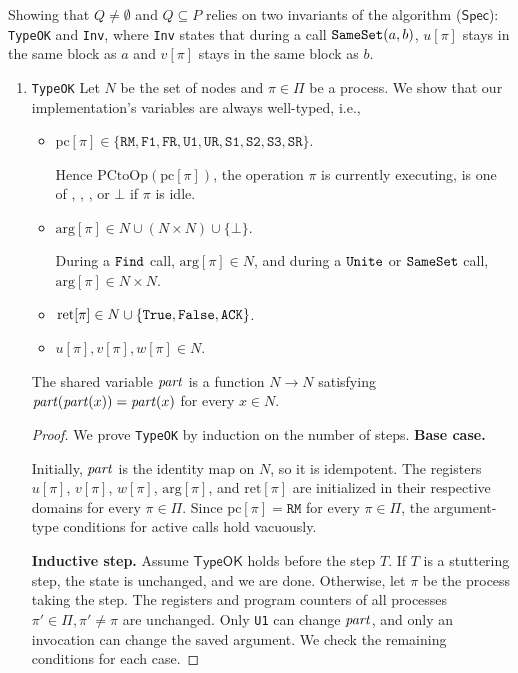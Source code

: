 \documentclass[12pt]{amsproc}
\begin{document}
Showing that $Q \neq \emptyset$ and $Q \subseteq P$ relies on two invariants of the algorithm ($\mathsf{Spec}$): \texttt{TypeOK} and \texttt{Inv}, where \texttt{Inv} states that during a call $\texttt{SameSet}{}(a,b)$, $u[\pi]$ stays in the same block as $a$ and $v[\pi]$ stays in the same block as $b$.
\begin{enumerate}
    \item \texttt{TypeOK}
    \bbni
    Let $N$ be the set of nodes and $\pi \in \Pi$ be a process. We show that our implementation's variables are always well-typed, i.e.,
    \begin{itemize}
        \item $\mathrm{pc}[\pi]\in \{\texttt{RM}, \texttt{F1}, \texttt{FR}, \texttt{U1}, \texttt{UR}, \texttt{S1}, \texttt{S2}, \texttt{S3}, \texttt{SR}\}$.

        Hence $\mathrm{PCtoOp}(\mathrm{pc}[\pi])$, the operation $\pi$ is currently executing, is one of \Find{}, \Unite{}, \SameSet{}, or $\bot$ if $\pi$ is idle.

        \item $\mathrm{arg}[\pi]\in N\cup(N\times N)\cup\{\bot\}$.
        
        During a $\texttt{Find}{}$ call, $\mathrm{arg}[\pi]\in N$, and during a $\texttt{Unite}{}$ or $\texttt{SameSet}{}$ call, $\mathrm{arg}[\pi]\in N\times N$.

        \item $\mathrm{ret}[\pi]\in N\cup\{\texttt{True{}}{},\texttt{False{}}{},\texttt{ACK}\}$.

        \item $u[\pi],v[\pi],w[\pi]\in N$.
    \end{itemize}
    The shared variable $\mathit{part}$ is a function $N\to N$ satisfying $\mathit{part}(\mathit{part}(x))=\mathit{part}(x)$ for every $x\in N$.

    \begin{proof}

    \bbni 
    
    We prove \texttt{TypeOK} by induction on the number of steps.
    \bbni
    \textbf{Base case.}

    Initially, $\mathit{part}$ is the identity map on $N$, so it is idempotent. The registers $u[\pi]$, $v[\pi]$, $w[\pi]$, $\mathrm{arg}[\pi]$, and $\mathrm{ret}[\pi]$ are initialized in their respective domains for every $\pi\in\Pi$. Since $\mathrm{pc}[\pi]=\texttt{RM}$ for every $\pi\in\Pi$, the argument-type conditions for active calls hold vacuously.

    \textbf{Inductive step.}
    Assume $\mathsf{TypeOK}$ holds before the step $T$. If $T$ is a stuttering step, the state is unchanged, and we are done. Otherwise, let $\pi$ be the process taking the step. The registers and program counters of all processes $\pi' \in \Pi, \pi' \ne\pi$ are unchanged. Only \texttt{U1} can change $\mathit{part}$, and only an invocation can change the saved argument. We check the remaining conditions for each case.


\end{proof}
\end{enumerate}
\end{document}
